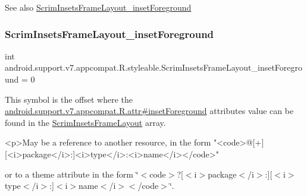 \begin{DoxySeeAlso}{See also}
\hyperlink{classandroid_1_1support_1_1v7_1_1appcompat_1_1R_1_1styleable_a313bb6eaa7f60f9308d2d585cff17d58}{Scrim\+Insets\+Frame\+Layout\+\_\+inset\+Foreground} 
\end{DoxySeeAlso}
\mbox{\label{classandroid_1_1support_1_1v7_1_1appcompat_1_1R_1_1styleable_a313bb6eaa7f60f9308d2d585cff17d58}} 
\subsubsection{\texorpdfstring{Scrim\+Insets\+Frame\+Layout\+\_\+inset\+Foreground}{ScrimInsetsFrameLayout\_insetForeground}}
{\footnotesize\ttfamily int android.\+support.\+v7.\+appcompat.\+R.\+styleable.\+Scrim\+Insets\+Frame\+Layout\+\_\+inset\+Foreground = 0\hspace{0.3cm}{\ttfamily [static]}}

This symbol is the offset where the \hyperlink{classandroid_1_1support_1_1v7_1_1appcompat_1_1R_1_1attr_a5890e2c1d15e1bb94792c2f019dca401}{android.\+support.\+v7.\+appcompat.\+R.\+attr\#inset\+Foreground} attribute\textquotesingle{}s value can be found in the \hyperlink{classandroid_1_1support_1_1v7_1_1appcompat_1_1R_1_1styleable_af376156dde80b171fe1fca622ce00921}{Scrim\+Insets\+Frame\+Layout} array.

\begin{DoxyVerb}      <p>May be a reference to another resource, in the form "<code>@[+][<i>package</i>:]<i>type</i>:<i>name</i></code>"
\end{DoxyVerb}
 or to a theme attribute in the form \char`\"{}$<$code$>$?\mbox{[}$<$i$>$package$<$/i$>$\+:\mbox{]}\mbox{[}$<$i$>$type$<$/i$>$\+:\mbox{]}$<$i$>$name$<$/i$>$$<$/code$>$\char`\"{}. 

